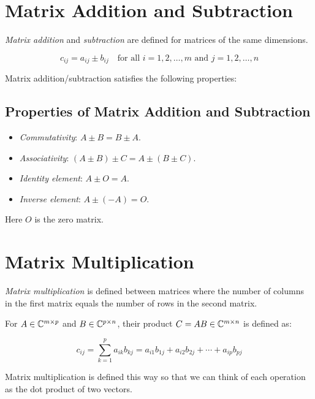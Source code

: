 \section{Matrix Addition and Subtraction}

\emph{Matrix addition} and \emph{subtraction} are defined for matrices of the same dimensions.

\[
    c_{ij} = a_{ij} \pm b_{ij} \quad \text{for all } i = 1, 2, \ldots, m \text{ and } j = 1, 2, \ldots, n
\]

Matrix addition/subtraction satisfies the following properties:

\subsection{Properties of Matrix Addition and Subtraction}

\begin{itemize}

    \item \emph{Commutativity}: \(A \pm B = B \pm A\).

    \item \emph{Associativity}: \((A \pm B) \pm C = A \pm (B \pm C)\).

    \item \emph{Identity element}: \(A \pm O = A\).
   
    \item \emph{Inverse element}: \(A \pm (-A) = O\).

\end{itemize}

Here \(O\) is the zero matrix.

\section{Matrix Multiplication}

\emph{Matrix multiplication} is defined between matrices where the number of columns in the first
matrix equals the number of rows in the second matrix.

For \(A \in \mathbb{C}^{m \times p}\) and \(B \in \mathbb{C}^{p \times n}\), their product \(C = AB \in \mathbb{C}^{m \times n}\) is defined as:

\[
    c_{ij} = \sum_{k=1}^{p} a_{ik}b_{kj} = a_{i1}b_{1j} + a_{i2}b_{2j} + \cdots + a_{ip}b_{pj}
\]

Matrix multiplication is defined this way so that we can think of each operation as the dot product of two vectors.

